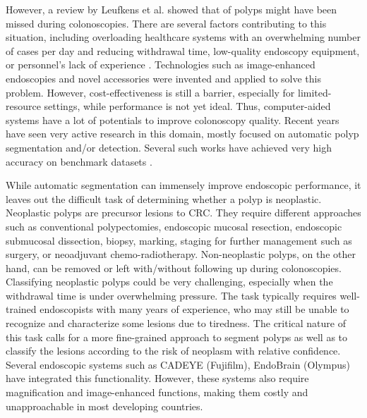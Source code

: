 \documentclass[runningheads]{llncs}
\begin{document}
	However, a review by Leufkens et al. \cite{leufkens2012factors} showed that  of polyps might have been missed during colonoscopies. There are several factors contributing to this situation, including overloading healthcare systems with an overwhelming number of cases per day and reducing withdrawal time, low-quality endoscopy equipment, or personnel's lack of experience \cite{armin2015visibility,lee2008adequate}. Technologies such as image-enhanced endoscopies and novel accessories were invented and applied to solve this problem. However, cost-effectiveness is still a barrier, especially for limited-resource settings, while performance is not yet ideal. Thus, computer-aided systems have a lot of potentials to improve colonoscopy quality. Recent years have seen very active research in this domain, mostly focused on automatic polyp segmentation and/or detection. Several such works have achieved very high accuracy on benchmark datasets \cite{fan2020pranet,huang2021hardnet,tang2019cu}.

	While automatic segmentation can immensely improve endoscopic performance, it leaves out the difficult task of determining whether a polyp is neoplastic. Neoplastic polyps are precursor lesions to CRC. They require different approaches such as conventional polypectomies, endoscopic mucosal resection, endoscopic submucosal dissection, biopsy, marking, staging for further management such as surgery, or neoadjuvant chemo-radiotherapy. Non-neoplastic polyps, on the other hand, can be removed or left with/without following up during colonoscopies. Classifying neoplastic polyps could be very challenging, especially when the withdrawal time is under overwhelming pressure. The task typically requires well-trained endoscopists with many years of experience, who may still be unable to recognize and characterize some lesions due to tiredness. The critical nature of this task calls for a more fine-grained approach to segment polyps as well as to classify the lesions according to the risk of neoplasm with relative confidence. Several endoscopic systems such as CADEYE (Fujifilm), EndoBrain (Olympus) have integrated this functionality. However, these systems also require magnification and image-enhanced functions, making them costly and unapproachable in most developing countries.
\end{document}
